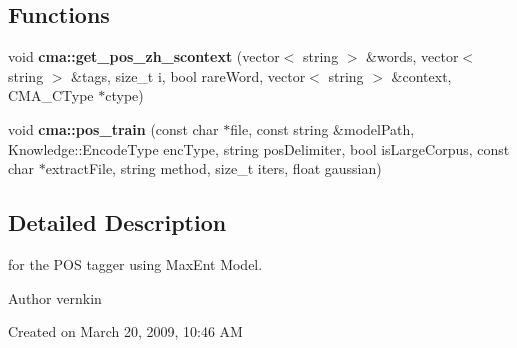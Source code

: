 \subsection*{Functions}
\begin{DoxyCompactItemize}
\item 
void {\bf cma::get\_\-pos\_\-zh\_\-scontext} (vector$<$ string $>$ \&words, vector$<$ string $>$ \&tags, size\_\-t i, bool rareWord, vector$<$ string $>$ \&context, CMA\_\-CType $\ast$ctype)
\item 
void {\bf cma::pos\_\-train} (const char $\ast$file, const string \&modelPath, Knowledge::EncodeType encType, string posDelimiter, bool isLargeCorpus, const char $\ast$extractFile, string method, size\_\-t iters, float gaussian)
\end{DoxyCompactItemize}


\subsection{Detailed Description}
for the POS tagger using MaxEnt Model. \begin{DoxyAuthor}{Author}
vernkin
\end{DoxyAuthor}
Created on March 20, 2009, 10:46 AM 